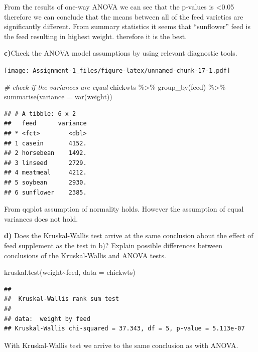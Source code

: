 \documentclass[
]{article}
\newenvironment{Shaded}{\begin{snugshade}}{\end{snugshade}}
\newcommand{\AttributeTok}[1]{\textcolor[rgb]{0.77,0.63,0.00}{#1}}
\newcommand{\CommentTok}[1]{\textcolor[rgb]{0.56,0.35,0.01}{\textit{#1}}}
\newcommand{\FunctionTok}[1]{\textcolor[rgb]{0.00,0.00,0.00}{#1}}
\newcommand{\NormalTok}[1]{#1}
\newcommand{\SpecialCharTok}[1]{\textcolor[rgb]{0.00,0.00,0.00}{#1}}
\begin{document}
From the results of one-way ANOVA we can see that the p-values is
\textless0.05 therefore we can conclude that the means between all of
the feed varieties are significantly different. From summary statistics
it seems that ``sunflower'' feed is the feed resulting in highest
weight. therefore it is the best.

\textbf{c)}Check the ANOVA model assumptions by using relevant
diagnostic tools.

\begin{Shaded}
\end{Shaded}

\texttt{[image: Assignment-1\_files/figure-latex/unnamed-chunk-17-1.pdf]}

\begin{Shaded}
\begin{Highlighting}[]
\CommentTok{\# check if the variances are equal}
\NormalTok{chickwts }\SpecialCharTok{\%\textgreater{}\%} 
  \FunctionTok{group\_by}\NormalTok{(feed) }\SpecialCharTok{\%\textgreater{}\%} 
  \FunctionTok{summarise}\NormalTok{(}\AttributeTok{variance =} \FunctionTok{var}\NormalTok{(weight))}
\end{Highlighting}
\end{Shaded}

\begin{verbatim}
## # A tibble: 6 x 2
##   feed      variance
## * <fct>        <dbl>
## 1 casein       4152.
## 2 horsebean    1492.
## 3 linseed      2729.
## 4 meatmeal     4212.
## 5 soybean      2930.
## 6 sunflower    2385.
\end{verbatim}

From qqplot assumption of normality holds. However the assumption of
equal variances does not hold.

\textbf{d)} Does the Kruskal-Wallis test arrive at the same conclusion
about the effect of feed supplement as the test in b)? Explain possible
differences between conclusions of the Kruskal-Wallis and ANOVA tests.

\begin{Shaded}
\begin{Highlighting}[]
\FunctionTok{kruskal.test}\NormalTok{(weight}\SpecialCharTok{\textasciitilde{}}\NormalTok{feed, }\AttributeTok{data =}\NormalTok{ chickwts)}
\end{Highlighting}
\end{Shaded}

\begin{verbatim}
## 
##  Kruskal-Wallis rank sum test
## 
## data:  weight by feed
## Kruskal-Wallis chi-squared = 37.343, df = 5, p-value = 5.113e-07
\end{verbatim}

With Kruskal-Wallis test we arrive to the same conclusion as with ANOVA.
\end{document}
